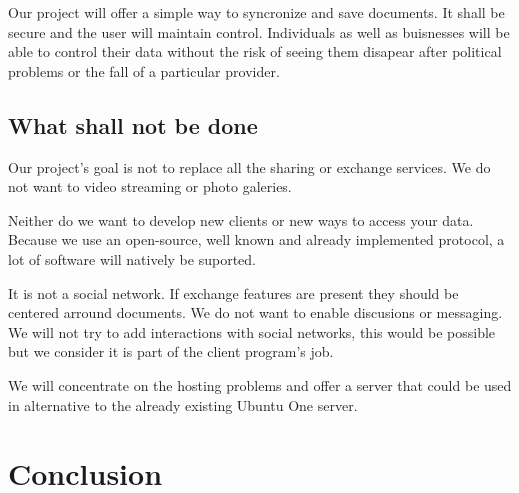 \documentclass[12pt]{report}
\begin{document}
Our project will offer a simple way to syncronize and save documents. It shall be secure and the user will maintain control. Individuals as well as buisnesses will be able to control their data without the risk of seeing them disapear after political problems or the fall of a particular provider.

\section{What shall not be done}

Our project's goal is not to replace all the sharing or exchange services. We do not want to video streaming or photo galeries.

Neither do we want to develop new clients or new ways to access your data. Because we use an open-source, well known and already implemented protocol, a lot of software will natively be suported.

It is not a social network. If exchange features are present they should be centered arround documents. We do not want to enable discusions or messaging. We will not try to add interactions with social networks, this would be possible but we consider it is part of the client program's job.

We will concentrate on the hosting problems and offer a server that could be used in alternative to the already existing Ubuntu One server.

\chapter{Conclusion}
\thispagestyle{EIP}


\end{document}
